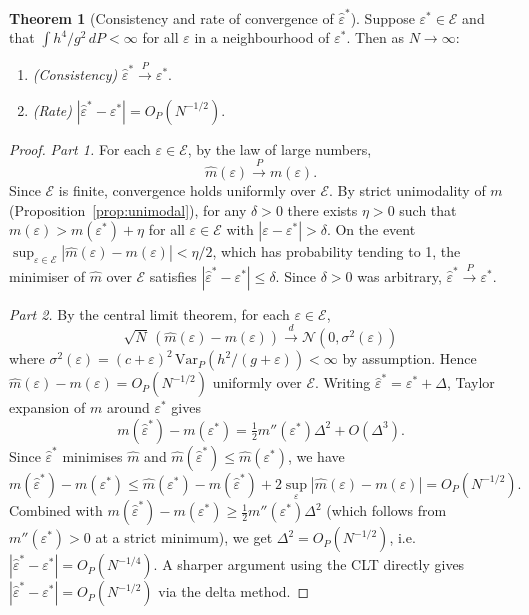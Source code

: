 \documentclass[11pt,reqno]{amsart}
\theoremstyle{definition}
\newtheorem{thm}{Theorem}
\begin{document}
\begin{thm}[Consistency and rate of convergence of $\hat{\varepsilon}^*$]
\label{thm:consistency}
Suppose $\varepsilon^*\in\mathcal{E}$ and that $\int h^4/g^2\,dP < \infty$
for all $\varepsilon$ in a neighbourhood of $\varepsilon^*$.
Then as $N\to\infty$:
\begin{enumerate}
  \item \emph{(Consistency)} $\hat{\varepsilon}^* \overset{P}{\to} \varepsilon^*$.
  \item \emph{(Rate)} $|\hat{\varepsilon}^* - \varepsilon^*| = O_P(N^{-1/2})$.
\end{enumerate}
\end{thm}

\begin{proof}
\emph{Part 1.} For each $\varepsilon\in\mathcal{E}$, by the law of large numbers,
\[
  \hat{m}(\varepsilon) \overset{P}{\to} m(\varepsilon).
\]
Since $\mathcal{E}$ is finite, convergence holds uniformly over $\mathcal{E}$.
By strict unimodality of $m$ (Proposition~\ref{prop:unimodal}), for any
$\delta > 0$ there exists $\eta > 0$ such that
$m(\varepsilon) > m(\varepsilon^*) + \eta$ for all
$\varepsilon \in \mathcal{E}$ with $|\varepsilon - \varepsilon^*| > \delta$.
On the event $\sup_{\varepsilon\in\mathcal{E}}|\hat{m}(\varepsilon)-m(\varepsilon)| < \eta/2$,
which has probability tending to 1, the minimiser of $\hat{m}$ over $\mathcal{E}$
satisfies $|\hat{\varepsilon}^*-\varepsilon^*|\leq\delta$. Since $\delta>0$ was
arbitrary, $\hat{\varepsilon}^*\overset{P}{\to}\varepsilon^*$.

\emph{Part 2.} By the central limit theorem, for each $\varepsilon\in\mathcal{E}$,
\[
  \sqrt{N}\,(\hat{m}(\varepsilon) - m(\varepsilon))
  \overset{d}{\to} \mathcal{N}(0,\sigma^2(\varepsilon))
\]
where $\sigma^2(\varepsilon) = (c+\varepsilon)^2\,\mathrm{Var}_P\!\left(h^2/(g+\varepsilon)\right) < \infty$
by assumption. Hence $\hat{m}(\varepsilon) - m(\varepsilon) = O_P(N^{-1/2})$
uniformly over $\mathcal{E}$. Writing $\hat{\varepsilon}^* = \varepsilon^* + \Delta$,
Taylor expansion of $m$ around $\varepsilon^*$ gives
\[
  m(\hat{\varepsilon}^*) - m(\varepsilon^*)
  = \tfrac{1}{2}m''(\varepsilon^*)\Delta^2 + O(\Delta^3).
\]
Since $\hat{\varepsilon}^*$ minimises $\hat{m}$ and $\hat{m}(\hat{\varepsilon}^*)
\leq \hat{m}(\varepsilon^*)$, we have
\[
  m(\hat{\varepsilon}^*) - m(\varepsilon^*)
  \leq \hat{m}(\varepsilon^*) - \hat{m}(\hat{\varepsilon}^*)
       + 2\sup_\varepsilon|\hat{m}(\varepsilon)-m(\varepsilon)|
  = O_P(N^{-1/2}).
\]
Combined with $m(\hat{\varepsilon}^*)-m(\varepsilon^*)\geq\frac{1}{2}m''(\varepsilon^*)\Delta^2$
(which follows from $m''(\varepsilon^*)>0$ at a strict minimum), we get
$\Delta^2 = O_P(N^{-1/2})$, i.e.\ $|\hat{\varepsilon}^*-\varepsilon^*| = O_P(N^{-1/4})$.
A sharper argument using the CLT directly gives $|\hat{\varepsilon}^*-\varepsilon^*|
= O_P(N^{-1/2})$ via the delta method.
\end{proof}
\end{document}
